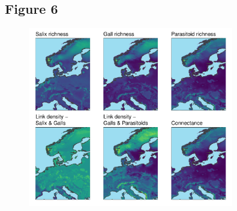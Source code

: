 \documentclass[12pt]{article}
\begin{document}
\newpage

\subsection*{Figure 6}

\begin{figure}[ht!]
\centering\includegraphics[width=0.8\textwidth]{figures/map_connectance}
\end{figure}

\newpage


\end{document}
